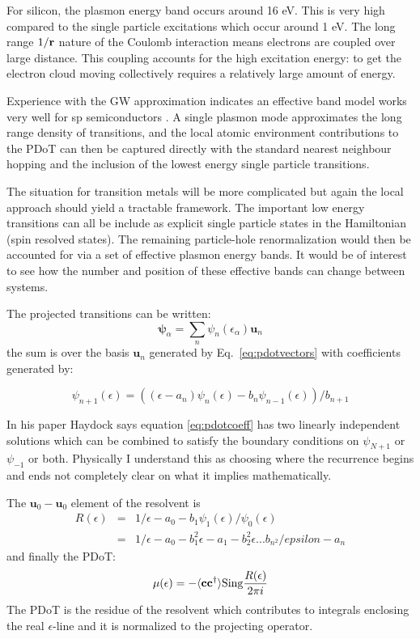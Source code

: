\documentclass{article}
\def\ket{\rangle}
\def\bra{\langle}
\def\r{{\bf r}}
\begin{document}
For silicon, the plasmon energy band occurs around 16 eV. This is very high compared
to the single particle excitations which occur around 1 eV. The long range $1/\r$ nature of the Coulomb
interaction means electrons are coupled over large distance.
This coupling accounts for the high excitation energy: to get the
electron cloud moving collectively requires a relatively large amount of energy.

Experience with the GW approximation indicates an effective band model works very well
for sp semiconductors \cite{godbyneeds, hybertsenlouie, bergstressen}. 
A single plasmon mode approximates the long range density of transitions, and the local
atomic environment contributions to the PDoT can then be captured directly with the standard nearest
neighbour hopping and the inclusion of the lowest energy single particle transitions.

The situation for transition metals will be more complicated but again the local approach should yield 
a tractable framework. The important low energy transitions can all be include as explicit single particle states
in the Hamiltonian (spin resolved states). The remaining particle-hole renormalization would then
be accounted for via a set of effective plasmon energy bands. It would be of interest to
see how the number and position of these effective bands can change between systems.

The projected transitions can be written:
%
\begin{equation}
\mathbf{\psi}_{\alpha} = \sum_{n} \psi_{n}(\epsilon_{\alpha})\mathbf{u}_{n}
\end{equation}
%
the sum is over the basis ${\mathbf{u}_{n}}$ generated by Eq.~\ref{eq:pdotvectors}
with coefficients generated by:

\begin{equation}
\label{eq:pdotcoeff}
\psi_{n+1}(\epsilon) = ((\epsilon-a_{n})\psi_{n}(\epsilon) - b_{n}\psi_{n-1}(\epsilon))/b_{n+1}
\end{equation}

In his paper Haydock says equation \ref{eq:pdotcoeff} has two linearly independent solutions
which can be combined to satisfy the boundary conditions on $\psi_{N+1}$ or $\psi_{-1}$ or both.
Physically I understand this as choosing where the recurrence begins and ends not completely
clear on what it implies mathematically.

The $\mathbf{u}_{0}-\mathbf{u}_{0}$ element of the resolvent is
%
\begin{eqnarray}
R(\epsilon)& = & 1/\epsilon-a_{0}-b_{1}\psi_{1}(\epsilon)/\psi_{0}(\epsilon) \\
  & = & 1/\epsilon-a_{0}-b^{2}_{1}\epsilon-a_{1}-b^{2}_{2}\epsilon ... b_{n^{2}}/epsilon-a_{n}
\end{eqnarray}
%
and finally the PDoT:
%
\begin{equation}
\mu(\epsilon) = -\bra \mathbf{c} \mathbf{c}^{\dagger}\ket {\rm Sing} \frac{R(\epsilon)}{2\pi i}
\end{equation}
%
The PDoT is the residue of the resolvent which contributes to integrals enclosing the 
real $\epsilon$-line and it is normalized to the projecting operator.
\end{document}
